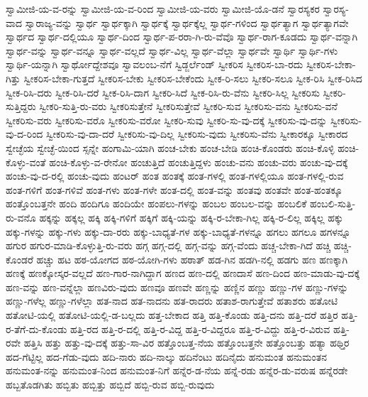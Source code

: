 {ಸ್ವಾಮೀಜಿ-ಯ-ವ-ರನ್ನು
ಸ್ವಾಮೀಜಿ-ಯ-ವ-ರಿಂದ
ಸ್ವಾಮೀಜಿ-ಯ-ವರು
ಸ್ವಾಮೀಜಿ-ಯೊ-ಡನೆ
ಸ್ವಾರಸ್ಯಕರ
ಸ್ವಾರಸ್ಯ-ವಾದ
ಸ್ವಾರಾಜ್ಯ-ವನ್ನು
ಸ್ವಾರ್ಥ
ಸ್ವಾರ್ಥಕ್ಕಾಗಿ
ಸ್ವಾರ್ಥಕ್ಕೆ
ಸ್ವಾರ್ಥಕ್ಕೆಲ್ಲ
ಸ್ವಾರ್ಥ-ಗಳಿಂದ
ಸ್ವಾರ್ಥತ್ಯಾಗ
ಸ್ವಾರ್ಥತ್ಯಾಗವೇ
ಸ್ವಾರ್ಥದ
ಸ್ವಾರ್ಥ-ದಲ್ಲಿಯೂ
ಸ್ವಾರ್ಥ-ದಿಂದ
ಸ್ವಾರ್ಥ-ಪ-ರರಾ-ಗಿ-ರು-ವೆವೊ
ಸ್ವಾರ್ಥ-ರಾಗ-ಕೂಡದು
ಸ್ವಾರ್ಥ-ವನ್ನಾಗಿ
ಸ್ವಾರ್ಥ-ವನ್ನು
ಸ್ವಾರ್ಥ-ವನ್ನೂ
ಸ್ವಾರ್ಥ-ವಲ್ಲದೆ
ಸ್ವಾರ್ಥ-ವಿಲ್ಲ
ಸ್ವಾರ್ಥ-ವೆಲ್ಲಾ
ಸ್ವಾರ್ಥವೇ
ಸ್ವಾರ್ಥಿ
ಸ್ವಾರ್ಥಿ-ಗಳು
ಸ್ವಾರ್ಥಿ-ಯನ್ನಾಗಿ
ಸ್ವಾರ್ಥೋದ್ದೇಶವೂ
ಸ್ವಾವಲಂಬ-ನೆಗೆ
ಸ್ವಿಡ್ಜರ್ಲೆಂಡ್
ಸ್ವೀಕರಿಸ
ಸ್ವೀಕರಿಸ-ಬಾ-ರದು
ಸ್ವೀಕರಿಸ-ಬೇಕಾ-ಗಿತ್ತು
ಸ್ವೀಕರಿಸ-ಬೇಕಾ-ಗುತ್ತದೆ
ಸ್ವೀಕರಿಸ-ಬೇಕು
ಸ್ವೀಕರಿಸ-ಬೇಕೆಂದು
ಸ್ವೀಕ-ರಿ-ಸಲು
ಸ್ವೀಕರಿ-ಸಲೂ
ಸ್ವೀಕ-ರಿಸಿ
ಸ್ವೀಕ-ರಿಸಿದ
ಸ್ವೀಕ-ರಿಸಿ-ದರು
ಸ್ವೀಕ-ರಿಸಿ-ದರೆ
ಸ್ವೀಕ-ರಿಸಿ-ದಾಗ
ಸ್ವೀಕರಿ-ಸಿದೆ
ಸ್ವೀಕ-ರಿಸಿ-ರು-ವೆನು
ಸ್ವೀಕರಿ-ಸಿಲ್ಲ
ಸ್ವೀಕರಿಸು
ಸ್ವೀಕರಿ-ಸುತ್ತಿದ್ದರು
ಸ್ವೀಕರಿ-ಸುತ್ತಿ-ರು-ವರು
ಸ್ವೀಕರಿಸುತ್ತೇನೆ
ಸ್ವೀಕರಿಸುತ್ತೇವೆ
ಸ್ವೀಕರಿ-ಸುವ
ಸ್ವೀಕರಿಸು-ವನು
ಸ್ವೀಕರಿಸು-ವನೆ
ಸ್ವೀಕರಿಸು-ವರು
ಸ್ವೀಕರಿಸು-ವರೊ
ಸ್ವೀಕರಿಸು-ವರೋ
ಸ್ವೀಕರಿ-ಸುವು
ಸ್ವೀಕರಿ-ಸು-ವು-ದಕ್ಕೆ
ಸ್ವೀಕರಿಸು-ವು-ದನ್ನು
ಸ್ವೀಕರಿಸು-ವು-ದ-ರಿಂದ
ಸ್ವೀಕರಿಸು-ವು-ದಾ-ದರೆ
ಸ್ವೀಕರಿಸು-ವು-ದಿಲ್ಲ
ಸ್ವೀಕರಿಸು-ವುದು
ಸ್ವೀಕರಿಸು-ವೆನು
ಸ್ವೀಕಾರಕ್ಕೂ
ಸ್ವೀಕಾರದ
ಸ್ವೇಚ್ಛೆಯ
ಸ್ವೇಚ್ಛೆ-ಯಿಂದ
ಸ್ಸನ್ನೇ
ಹಂಗಾಮಿ-ಯಾಗಿ
ಹಂಚ-ಬೇಕು
ಹಂಚ-ಬೇಡಿ
ಹಂಚಿ-ಕೊಂಡರು
ಹಂಚಿ-ಕೊಳ್ಳಿ
ಹಂಚಿ-ಕೊಳ್ಳು-ವಂತೆ
ಹಂಚಿ-ಕೊಳ್ಳು-ವ-ರೇನೋ
ಹಂಚುತ್ತಿದೆ
ಹಂಚುತ್ತಿದ್ದಳು
ಹಂಚು-ವನು
ಹಂಚು-ವರು
ಹಂಚು-ವು-ದಕ್ಕೆ
ಹಂಚು-ವು-ದ-ರಲ್ಲಿ
ಹಂಚು-ವುದು
ಹಂಟರ್
ಹಂತ
ಹಂತಕ್ಕೆ
ಹಂತ-ಗಳಲ್ಲಿ
ಹಂತ-ಗಳಲ್ಲಿಯೂ
ಹಂತ-ಗಳಲ್ಲಿ-ರುವ
ಹಂತ-ಗಳಿಗೆ
ಹಂತ-ಗಳಿವೆ
ಹಂತ-ಗಳು
ಹಂತ-ಗಳೇ
ಹಂತ-ದಲ್ಲಿ
ಹಂತ-ವನ್ನು
ಹಂತವು
ಹಂತವೇ
ಹಂತ-ಹಂತಕ್ಕೂ
ಹಂತ್ತೊಂಬತ್ತನೇ
ಹಂದಿ
ಹಂದಿಗೂ
ಹಂದಿಯೇ
ಹಂಪಲು-ಗಳನ್ನು
ಹಂಬಲ
ಹಂಬಲ-ವನ್ನು
ಹಂಬಲಿಕೆ
ಹಂಬಲಿ-ಸುತ್ತಿ-ರು-ವನೊ
ಹಕ್ಕನ್ನು
ಹಕ್ಕಲ್ಲ
ಹಕ್ಕಿ
ಹಕ್ಕಿ-ಗಳಿಗೆ
ಹಕ್ಕಿಗೆ
ಹಕ್ಕಿ-ಯನ್ನು
ಹಕ್ಕಿ-ರ-ಬೇಕಾ-ಗಿಲ್ಲ
ಹಕ್ಕಿ-ರ-ಲಿಲ್ಲ
ಹಕ್ಕಿಲ್ಲ
ಹಕ್ಕು
ಹಕ್ಕು-ಗಳನ್ನು
ಹಕ್ಕು-ಗಳು
ಹಕ್ಕು-ದಾ-ರರು
ಹಕ್ಕು-ಬಾಧ್ಯತೆ-ಗಳ
ಹಕ್ಕು-ಬಾಧ್ಯತೆ-ಗಳನ್ನೂ
ಹಗಲು
ಹಗಲೂ
ಹಗಳನ್ನೂ
ಹಗುರ
ಹಗುರ-ಮಾಡಿ-ಕೊಳ್ಳುತ್ತಿ-ರು-ವರು
ಹಗ್ಗ
ಹಗ್ಗ-ದಲ್ಲಿ
ಹಗ್ಗ-ವನ್ನು
ಹಗ್ಗ-ವೆಂದು
ಹಚ್ಚ-ಬೇಕಾ-ಗಿದೆ
ಹಚ್ಚಿ
ಹಚ್ಚಿ-ಕೊಂಡರೆ
ಹಚ್ಚು
ಹಟ
ಹಠ-ಯೋಗದ
ಹಠ-ಯೋಗಿ-ಗಳು
ಹಠಾತ್
ಹಡ-ಗಿನ
ಹಡಗಿ-ನಲ್ಲಿ
ಹಡಗು
ಹಣ
ಹಣಕ್ಕಾಗಿ
ಹಣಕ್ಕೆ
ಹಣಕ್ಕೋಸ್ಕರ-ವಲ್ಲದೆ
ಹಣ-ಗಾರ-ನಾಗಿದ್ದಾಗ
ಹಣದ
ಹಣ-ದಲ್ಲಿ
ಹಣದಾಸೆ
ಹಣ-ದಿಂದ
ಹಣ-ಮಾಡು-ವು-ದಕ್ಕೆ
ಹಣ-ವನ್ನು
ಹಣ-ವನ್ನೆಲ್ಲಾ
ಹಣವಿರು-ವುದು
ಹಣವೂ
ಹಣವೇ
ಹಣ್ಣನ್ನು
ಹಣ್ಣಿನ
ಹಣ್ಣು
ಹಣ್ಣು-ಗಳ
ಹಣ್ಣು-ಗಳನ್ನು
ಹಣ್ಣು-ಗಳೆಲ್ಲ
ಹಣ್ಣು-ಗಳೆಲ್ಲಾ
ಹತ-ನಾದ
ಹತ-ನಾದನು
ಹತ-ರಾದರು
ಹತಾಶ-ರಾಗುತ್ತೇವೆ
ಹತಾಶರು
ಹತೋಟಿ
ಹತೋಟಿ-ಯಲ್ಲಿ
ಹತೋಟಿ-ಯಲ್ಲಿ-ಡ-ಬಲ್ಲದು
ಹತ್ತ-ಬೇಕಾದ
ಹತ್ತಿ
ಹತ್ತಿ-ಕೊಂಡು
ಹತ್ತಿ-ದನು
ಹತ್ತಿ-ದರೆ
ಹತ್ತಿರ
ಹತ್ತಿ-ರ-ತೆಗೆ-ದು-ಕೊಂಡು
ಹತ್ತಿ-ರದ
ಹತ್ತಿ-ರ-ದಲ್ಲಿ
ಹತ್ತಿ-ರ-ವಿದ್ದ
ಹತ್ತಿ-ರ-ವಿದ್ದರೂ
ಹತ್ತಿ-ರ-ವಿದ್ದು
ಹತ್ತಿ-ರ-ವಿರುವ
ಹತ್ತಿ-ರವೇ
ಹತ್ತಿಸಿ
ಹತ್ತು
ಹತ್ತು-ವು-ದಕ್ಕೆ
ಹತ್ತು-ಸಾ-ವಿರ
ಹತ್ತೊಂಬತ್ತ-ನೆಯ
ಹತ್ತೊಂಬತ್ತನೇ
ಹತ್ತೊಂಬತ್ತು
ಹತ್ಯಾ
ಹಥ್ತಿರ
ಹದ-ಗೆಟ್ಟಿಲ್ಲ
ಹದ-ಗೆಡು-ವುದು
ಹದಿ-ನಾರು
ಹದಿ-ನಾಲ್ಕು
ಹದಿನೆಂಟು
ಹದಿನೈದು
ಹನುಮಂತ
ಹನುಮಂತನ
ಹನುಮಂತ-ನನ್ನು
ಹನುಮಂತ-ನಿಂದ
ಹನುಮಂತ-ನಿಗೆ
ಹನ್ನೆರ-ಡ-ನೆಯ
ಹನ್ನೆ-ರಡು
ಹನ್ನೆರ-ಡು-ವರುಷ
ಹನ್ನೆರಡೇ
ಹಬ್ಬತೊಡಗಿತು
ಹಬ್ಬಿತು
ಹಬ್ಬಿತ್ತು
ಹಬ್ಬಿದೆ
ಹಬ್ಬಿ-ರುವ
ಹಬ್ಬಿ-ರುವುದು
}
